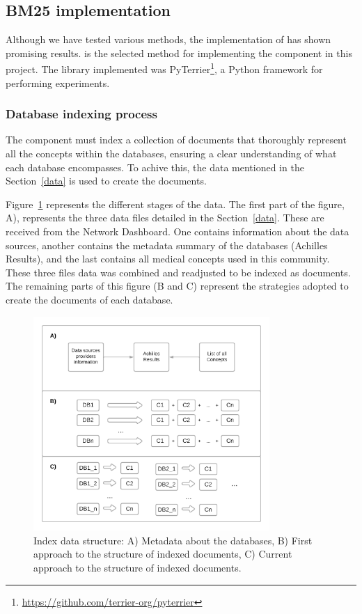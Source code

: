 \subsection{BM25 implementation}
\label{bm25implementation}

Although we have tested various methods, the implementation of {\bm} has shown promising results. {\bm} is the selected method for implementing the {\ir} component in this project. The library implemented was PyTerrier\footnote{\url{https://github.com/terrier-org/pyterrier}}, a Python framework for performing {\ir} experiments.


\subsubsection{Database indexing process}

The {\ir} component must index a collection of documents that thoroughly represent all the concepts within the databases, ensuring a clear understanding of what each database encompasses. To achive this, the data mentioned in the Section~\ref{data} is used to create the documents.

Figure~\ref{fig_struct} represents the different stages of the data. The first part of the figure, A), represents the three data files detailed in the Section~\ref{data}. These are received from the {\ehden} Network Dashboard. One contains information about the data sources, another contains the metadata summary of the databases (Achilles Results), and the last contains all medical concepts used in this community. These three files data was combined and readjusted to be indexed as documents. The remaining parts of this figure (B and C) represent the strategies adopted to create the documents of each database.

\begin{figure}[H]
    \includegraphics[width=0.8\textwidth]{figs/chapter3/index_struct.png}
    \centering
    \caption[Index data structure]{Index data structure: A) Metadata about the databases, B) First approach to the structure of indexed documents, C) Current approach to the structure of indexed documents.}
    \label{fig_struct}
\end{figure}


